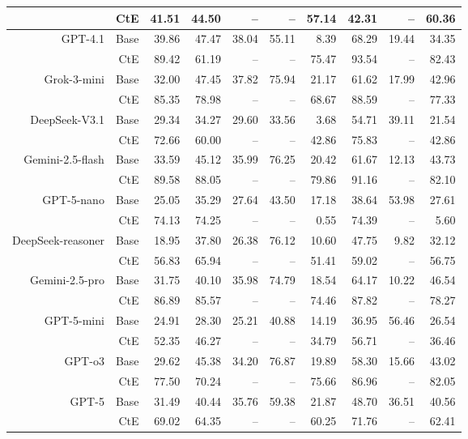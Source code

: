 \begin{table}[!t]
\begin{tabular}{r r !{\color{white!80!black} \vline} r r r r r !{\color{white!80!black} \vline} r r r}
 & CtE & 41.51 & 44.50 & -- & -- & 57.14 & 42.31 & -- & 60.36 \\ \midrule
 \sf GPT-4.1 & Base & 39.86 & 47.47 & 38.04 & 55.11 & 8.39 & 68.29 & 19.44 & 34.35 \\
 & CtE & 89.42 & 61.19 & -- & -- & 75.47 & 93.54 & -- & 82.43 \\ \midrule
 \sf Grok-3-mini & Base & 32.00 & 47.45 & 37.82 & 75.94 & 21.17 & 61.62 & 17.99 & 42.96 \\
 & CtE & 85.35 & 78.98 & -- & -- & 68.67 & 88.59 & -- & 77.33 \\ \midrule
 \sf DeepSeek-V3.1 & Base & 29.34 & 34.27 & 29.60 & 33.56 & 3.68 & 54.71 & 39.11 & 21.54 \\
 & CtE & 72.66 & 60.00 & -- & -- & 42.86 & 75.83 & -- & 42.86 \\ \midrule
 \sf Gemini-2.5-flash & Base & 33.59 & 45.12 & 35.99 & 76.25 & 20.42 & 61.67 & 12.13 & 43.73 \\
 & CtE & 89.58 & 88.05 & -- & -- & 79.86 & 91.16 & -- & 82.10 \\ \midrule
 \sf GPT-5-nano & Base & 25.05 & 35.29 & 27.64 & 43.50 & 17.18 & 38.64 & 53.98 & 27.61 \\
 & CtE & 74.13 & 74.25 & -- & -- & 0.55 & 74.39 & -- & 5.60 \\ \midrule
 \sf DeepSeek-reasoner & Base & 18.95 & 37.80 & 26.38 & 76.12 & 10.60 & 47.75 & 9.82 & 32.12 \\
 & CtE & 56.83 & 65.94 & -- & -- & 51.41 & 59.02 & -- & 56.75 \\ \midrule
 \sf Gemini-2.5-pro & Base & 31.75 & 40.10 & 35.98 & 74.79 & 18.54 & 64.17 & 10.22 & 46.54 \\
 & CtE & 86.89 & 85.57 & -- & -- & 74.46 & 87.82 & -- & 78.27 \\ \midrule
 \sf GPT-5-mini & Base & 24.91 & 28.30 & 25.21 & 40.88 & 14.19 & 36.95 & 56.46 & 26.54 \\
 & CtE & 52.35 & 46.27 & -- & -- & 34.79 & 56.71 & -- & 36.46 \\ \midrule
 \sf GPT-o3 & Base & 29.62 & 45.38 & 34.20 & 76.87 & 19.89 & 58.30 & 15.66 & 43.02 \\
 & CtE & 77.50 & 70.24 & -- & -- & 75.66 & 86.96 & -- & 82.05 \\ \midrule
 \sf GPT-5 & Base & 31.49 & 40.44 & 35.76 & 59.38 & 21.87 & 48.70 & 36.51 & 40.56 \\
 & CtE & 69.02 & 64.35 & -- & -- & 60.25 & 71.76 & -- & 62.41 \\ 
\bottomrule
\end{tabular}
\label{tab:cRi+}
\end{table}

